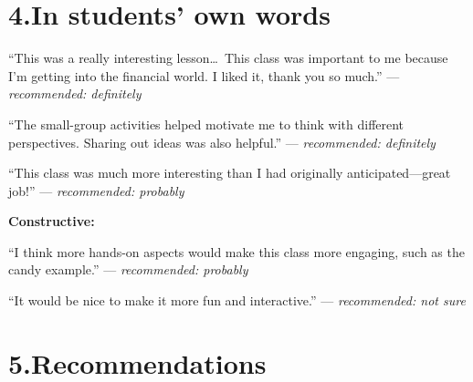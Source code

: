 \documentclass[letterpaper,10pt]{article}
\begin{document}
\section*{4.\quad In students' own words}

\begin{quotebox}
``This was a really interesting lesson\ldots\ This class was important to me because I'm getting
into the financial world. I liked it, thank you so much.'' \hfill --- \textit{recommended: definitely}
\end{quotebox}

\begin{quotebox}
``The small-group activities helped motivate me to think with different perspectives. Sharing out
ideas was also helpful.'' \hfill --- \textit{recommended: definitely}
\end{quotebox}

\begin{quotebox}
``This class was much more interesting than I had originally anticipated---great job!'' \hfill --- \textit{recommended: probably}
\end{quotebox}

\noindent\textbf{Constructive:}
\begin{quotebox}
``I think more hands-on aspects would make this class more engaging, such as the candy example.''
\hfill --- \textit{recommended: probably}
\end{quotebox}

\begin{quotebox}
``It would be nice to make it more fun and interactive.'' \hfill --- \textit{recommended: not sure}
\end{quotebox}

\section*{5.\quad Recommendations}
\end{document}
